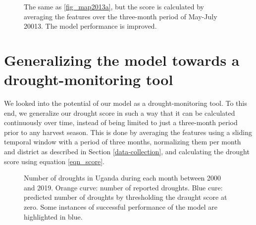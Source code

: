 \documentclass[10pt,parskip=half,
toc=sectionentrywithdots,
bibliography=totocnumbered,
captions=tableheading,numbers=noendperiod]{scrartcl}
\begin{document}
\begin{figure}[H]\begin{center}\end{center}\caption{The same as \ref{fig_map2013a}, but the score is calculated by averaging
the features over the three-month period of May-July 20013. The model
performance is improved.}\label{fig_map2013b}\end{figure}

\hypertarget{generalizing-the-model-towards-a-drought-monitoring-tool}{%
\section{Generalizing the model towards a drought-monitoring
tool}\label{generalizing-the-model-towards-a-drought-monitoring-tool}}

We looked into the potential of our model as a drought-monitoring tool.
To this end, we generalize our drought score in such a way that it can
be calculated continuously over time, instead of being limited to just a
three-month period prior to any harvest season. This is done by
averaging the features using a sliding temporal window with a period of
three months, normalizing them per month and district as described in
Section \ref{data-collection}, and calculating the drought score using
equation \ref{eqn_score}.

\begin{figure}[H]\begin{center}\end{center}\caption{Number of droughts in Uganda during each month between 2000 and 2019.
Orange curve: number of reported droughts. Blue cure: predicted number
of droughts by thresholding the draught score at zero. Some instances of
successful performance of the model are highlighted in blue.}\label{fig_droughtcount}\end{figure}
\end{document}
